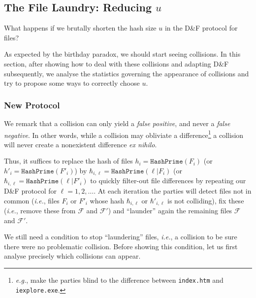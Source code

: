 \documentclass[11pt]{llncs}
\newcommand{\Files}{\mathcal{F}}
\newcommand{\df}{D\&F\xspace}
\newcommand{\ie}{\textit{i.e.}\xspace}
\newcommand{\eg}{\textit{e.g.}\xspace}
\newcommand{\HashPrime}{\ensuremath{\mathtt{HashPrime}}}
\begin{document}
\subsection{The File Laundry: Reducing $u$}
\label{shortu}
What happens if we brutally shorten the hash size $u$ in the \df protocol for files?

As expected by the birthday paradox, we should start seeing collisions. 
In this section, after showing how to deal with these collisions and adapting \df subsequently, we analyse the statistics governing the appearance of collisions and try to propose some ways to correctly choose $u$.

\subsubsection{New Protocol}

We remark that a collision can only yield a \textit{false positive}, and never a \textit{false negative}. In other words, while a collision may obliviate a difference\footnote{\eg, make the parties blind to the difference between {\tt index.htm} and {\tt iexplore.exe}.} a collision will never create a nonexistent difference \textit{ex nihilo}.

Thus, it suffices to replace the hash of files $h_i = \HashPrime(F_i)$ (or $h'_i = \HashPrime(F'_i)$) by $\hbar_{i,\ell}=\HashPrime(\ell|F_i)$ (or $\hbar_{i,\ell} = \HashPrime(\ell|F'_i)$ to quickly filter-out file differences by repeating our \df protocol for $\ell=1,2,\ldots$. 
At each iteration the parties will detect files not in common (\ie, files $F_i$ or $F'_i$ whose hash $\hbar_{i,\ell}$ or $\hbar'_{i,\ell}$ is not colliding), fix these (\ie, remove these from $\Files$ and $\Files'$) and ``launder'' again the remaining files $\Files$ and $\Files'$.

We still need a condition to stop ``laundering'' files, \ie, a collision to be sure there were no problematic collision.
Before showing this condition, let us first analyse precisely which collisions can appear.
\end{document}
